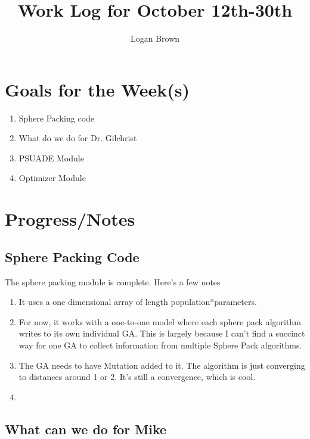 

\title{Work Log for October 12th-30th}
\author{Logan Brown}


\maketitle


\section{Goals for the Week(s)}
\begin{enumerate}
\item Sphere Packing code
\item What do we do for Dr. Gilchrist
\item PSUADE Module
\item Optimizer Module
\end{enumerate}

\section{Progress/Notes}
\subsection{Sphere Packing Code}
The sphere packing module is complete. Here's a few notes

\begin{enumerate}
	\item It uses a one dimensional array of length population*parameters.
	\item For now, it works with a one-to-one model where each sphere pack algorithm writes to its own individual GA. This is largely because I can't find a succinct way for one GA to collect information from multiple Sphere Pack algorithms.
	\item The GA needs to have Mutation added to it. The algorithm is just converging to distances around 1 or 2. It's still a convergence, which is cool.
	\item 
\end{enumerate}


\subsection{What can we do for Mike}



